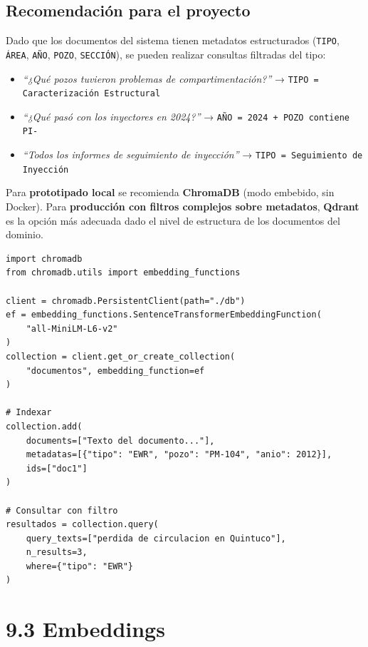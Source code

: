 \documentclass[12pt, a4paper]{report}
\begin{document}
\subsection*{Recomendación para el proyecto}

Dado que los documentos del sistema tienen metadatos estructurados (\texttt{TIPO},
\texttt{ÁREA}, \texttt{AÑO}, \texttt{POZO}, \texttt{SECCIÓN}), se pueden realizar
consultas filtradas del tipo:

\begin{itemize}
  \item \textit{``¿Qué pozos tuvieron problemas de compartimentación?''} →
    \texttt{TIPO = Caracterización Estructural}
  \item \textit{``¿Qué pasó con los inyectores en 2024?''} →
    \texttt{AÑO = 2024 + POZO contiene PI-}
  \item \textit{``Todos los informes de seguimiento de inyección''} →
    \texttt{TIPO = Seguimiento de Inyección}
\end{itemize}

Para \textbf{prototipado local} se recomienda \textbf{ChromaDB} (modo embebido, sin
Docker). Para \textbf{producción con filtros complejos sobre metadatos}, \textbf{Qdrant}
es la opción más adecuada dado el nivel de estructura de los documentos del dominio.

\begin{lstlisting}[caption={Ejemplo de uso con ChromaDB}]
import chromadb
from chromadb.utils import embedding_functions

client = chromadb.PersistentClient(path="./db")
ef = embedding_functions.SentenceTransformerEmbeddingFunction(
    "all-MiniLM-L6-v2"
)
collection = client.get_or_create_collection(
    "documentos", embedding_function=ef
)

# Indexar
collection.add(
    documents=["Texto del documento..."],
    metadatas=[{"tipo": "EWR", "pozo": "PM-104", "anio": 2012}],
    ids=["doc1"]
)

# Consultar con filtro
resultados = collection.query(
    query_texts=["perdida de circulacion en Quintuco"],
    n_results=3,
    where={"tipo": "EWR"}
)
\end{lstlisting}

\section*{9.3 Embeddings}
\end{document}
